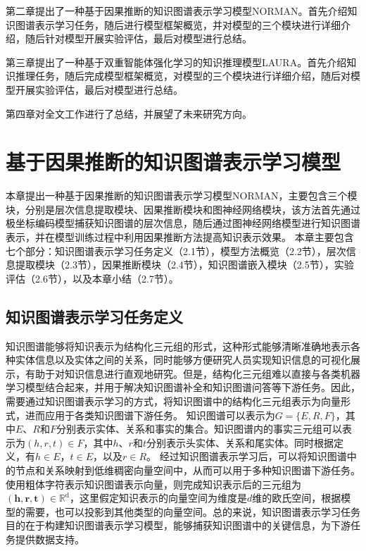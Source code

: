 \documentclass[algorithmlist, AutoFakeBold, AutoFakeSlant, figurelist, tablelist, nomlist, engineering]{seuthesix}
\begin{document}
第二章提出了一种基于因果推断的知识图谱表示学习模型NORMAN。首先介绍知识图谱表示学习任务，随后进行模型框架概览，并对模型的三个模块进行详细介绍，随后针对模型开展实验评估，最后对模型进行总结。

第三章提出了一种基于双重智能体强化学习的知识推理模型LAURA。首先介绍知识推理任务，随后完成模型框架概览，对模型的三个模块进行详细介绍，随后对模型开展实验评估，最后对模型进行总结。


第四章对全文工作进行了总结，并展望了未来研究方向。


\chapter{基于因果推断的知识图谱表示学习模型}
本章提出一种基于因果推断的知识图谱表示学习模型NORMAN，主要包含三个模块，分别是层次信息提取模块、因果推断模块和图神经网络模块，该方法首先通过极坐标编码模型捕获知识图谱的层次信息，随后通过图神经网络模型进行知识图谱表示，并在模型训练过程中利用因果推断方法提高知识表示效果。
本章主要包含七个部分：知识图谱表示学习任务定义（2.1节），模型方法概览（2.2节），层次信息提取模块（2.3节），因果推断模块（2.4节），知识图谱嵌入模块（2.5节），实验评估（2.6节），以及本章小结（2.7节）。

\section{知识图谱表示学习任务定义}
知识图谱能够将知识表示为结构化三元组的形式，这种形式能够清晰准确地表示各种实体信息以及实体之间的关系，同时能够方便研究人员实现知识信息的可视化展示，有助于对知识信息进行直观地研究。但是，结构化三元组难以直接与各类机器学习模型结合起来，并用于解决知识图谱补全和知识图谱问答等下游任务。因此，需要通过知识图谱表示学习的方式，将知识图谱中的结构化三元组表示为向量形式，进而应用于各类知识图谱下游任务。
知识图谱可以表示为$G=\{E, R, F\}$，其中$E$、$R$和$F$分别表示实体、关系和事实的集合。知识图谱内的事实三元组可以表示为$(h, r, t) \in F$，其中$h$、$r$和$t$分别表示头实体、关系和尾实体。同时根据定义，有$h \in E$，$t \in E$，以及$r \in R$。
经过知识图谱表示学习后，可以将知识图谱中的节点和关系映射到低维稠密向量空间中，从而可以用于多种知识图谱下游任务。使用粗体字符表示知识图谱表示向量，则完成知识表示后的三元组为$\left(\bm{h}, \bm{r}, \bm{t}\right) \in \mathbb{R}^{\mathrm{d}}$，这里假定知识表示的向量空间为维度是$d$维的欧氏空间，根据模型的需要，也可以投影到其他类型的向量空间。总的来说，知识图谱表示学习任务目的在于构建知识图谱表示学习模型，能够捕获知识图谱中的关键信息，为下游任务提供数据支持。
\end{document}
